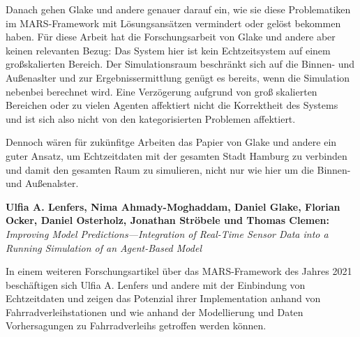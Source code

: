 Danach gehen Glake und andere genauer darauf ein, wie sie diese Problematiken im MARS-Framework mit Lösungsansätzen vermindert oder gelöst bekommen haben.
Für diese Arbeit hat die Forschungsarbeit von Glake und andere aber keinen relevanten Bezug:
Das System hier ist kein Echtzeitsystem auf einem großskalierten Bereich.
Der Simulationsraum beschränkt sich auf die Binnen- und Außenaslter und zur Ergebnissermittlung genügt es bereits, wenn die Simulation nebenbei berechnet wird.
Eine Verzögerung aufgrund von groß skalierten Bereichen oder zu vielen Agenten affektiert nicht die Korrektheit des Systems und ist sich also nicht von den kategorisierten Problemen affektiert.

Dennoch wären für zukünfitge Arbeiten das Papier von Glake und andere ein guter Ansatz, um Echtzeitdaten mit der gesamten Stadt Hamburg zu verbinden und damit den gesamten Raum zu simulieren, nicht nur wie hier um die Binnen- und Außenalster.


\textbf{Ulfia A. Lenfers, Nima Ahmady-Moghaddam, Daniel Glake, Florian Ocker, Daniel Osterholz, Jonathan Ströbele und Thomas Clemen:}
\textit{Improving Model Predictions—Integration of Real-Time Sensor Data into a Running Simulation of an Agent-Based Model}

In einem weiteren Forschungsartikel über das MARS-Framework des Jahres 2021 beschäftigen sich Ulfia A. Lenfers und andere mit der Einbindung von Echtzeitdaten und zeigen das Potenzial ihrer Implementation anhand von Fahrradverleihstationen und wie anhand der Modellierung und Daten Vorhersagungen zu Fahrradverleihs getroffen werden können.
